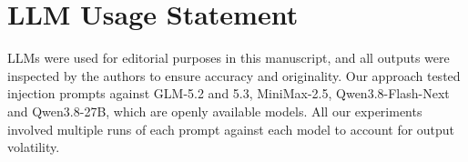 \documentclass[conference,compsoc]{IEEEtran}
\begin{document}


\section*{LLM Usage Statement}

\noindent LLMs were used for editorial purposes in this manuscript, and all outputs were inspected by the authors to ensure accuracy and originality. Our approach tested injection prompts against GLM-5.2 and 5.3, MiniMax-2.5, Qwen3.8-Flash-Next and Qwen3.8-27B, which are openly available models. All our experiments involved multiple runs of each prompt against each model to account for output volatility.

\flushcolsend



\appendices
\end{document}
